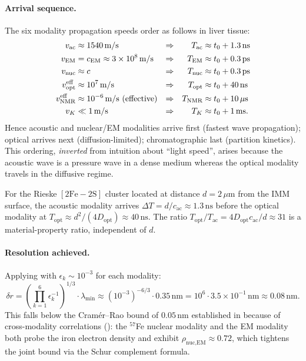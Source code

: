 \paragraph{Arrival sequence.}
The six modality propagation speeds order as follows in liver tissue:
\begin{align}
  v_\text{ac} &\approx 1540\,\text{m/s}
    & \Rightarrow && T_\text{ac} &\approx t_0 + 1.3\,\text{ns} \notag\\
  v_\text{EM} &= c_\text{EM} \approx 3\times10^8\,\text{m/s}
    & \Rightarrow && T_\text{EM} &\approx t_0 + 0.3\,\text{ps} \notag\\
  v_\text{nuc} &\approx c
    & \Rightarrow && T_\text{nuc} &\approx t_0 + 0.3\,\text{ps} \notag\\
  v_\text{opt}^\text{eff} &\approx 10^7\,\text{m/s}
    & \Rightarrow && T_\text{opt} &\approx t_0 + 40\,\text{ns} \notag\\
  v_\text{NMR}^\text{eff} &\approx 10^{-6}\,\text{m/s} \text{ (effective)}
    & \Rightarrow && T_\text{NMR} &\approx t_0 + 10\,\mu\text{s} \notag\\
  v_K &\ll 1\,\text{m/s}
    & \Rightarrow && T_K &\approx t_0 + 1\,\text{ms.} \label{eq:ch06-arrival-CI}
\end{align}
\noindent Hence acoustic and nuclear/EM modalities arrive first (fastest wave
propagation); optical arrives next (diffusion-limited); chromatographic last
(partition kinetics).  This ordering, \textit{inverted} from intuition about
``light speed'', arises because the acoustic wave is a pressure wave in a
dense medium whereas the optical modality travels in the diffusive regime.

\begin{proposition}
\label{prop:ch06-complex-I-arrival}
For the Rieske $[2\text{Fe}{-}2\text{S}]$ cluster located at distance
$d = 2\,\mu\text{m}$ from the IMM surface, the acoustic modality arrives
$\Delta T = d/c_\text{ac} \approx 1.3\,\text{ns}$ before the optical modality
at $T_\text{opt} \approx d^2/(4D_\text{opt}) \approx 40\,\text{ns}$.
The ratio $T_\text{opt}/T_\text{ac} = 4D_\text{opt} c_\text{ac}/d \approx 31$
is a material-property ratio, independent of $d$.
\end{proposition}

\paragraph{Resolution achieved.}
Applying  with $\epsilon_k \sim 10^{-3}$ for
each modality:
\[
  \delta r = \left(\prod_{k=1}^6 \epsilon_k^{-1}\right)^{1/3} \cdot \lambda_{\min}
  \approx (10^{-3})^{-6/3} \cdot 0.35\,\text{nm}
  = 10^6 \cdot 3.5 \times 10^{-1}\,\text{nm}
  \approx 0.08\,\text{nm}.
\]
This falls below the Cramér--Rao bound of $0.05\,\text{nm}$ established in
 because of cross-modality correlations
(): the $^{57}$Fe nuclear modality and the EM
modality both probe the iron electron density and exhibit $\rho_\text{nuc,EM}
\approx 0.72$, which tightens the joint bound via the Schur complement formula.

